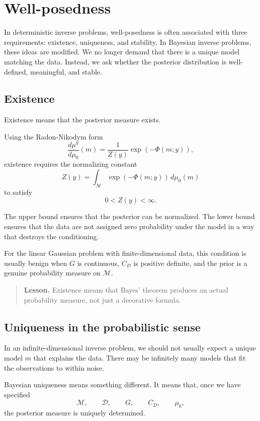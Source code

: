 \documentclass[11pt,a4paper]{book}
\newenvironment{lesson}
  {\begin{quote}\textbf{Lesson.}}
  {\end{quote}}
\newcommand{\M}{\mathcal{M}}      %
\newcommand{\D}{\mathcal{D}}      %
\newcommand{\prior}{\mu_0}
\newcommand{\post}{\mu^y}
\newcommand{\obs}{y}
\newcommand{\G}{G}
\begin{document}
\section{Well-posedness}

In deterministic inverse problems, well-posedness is often associated with
three requirements: existence, uniqueness, and stability. In Bayesian inverse
problems, these ideas are modified. We no longer demand that there is a unique
model matching the data. Instead, we ask whether the posterior distribution is
well-defined, meaningful, and stable.

\subsection{Existence}

Existence means that the posterior measure exists.

Using the Radon-Nikodym form
\[
    \frac{d\post}{d\prior}(m)
    =
    \frac{1}{Z(\obs)}
    \exp(-\Phi(m;\obs)),
\]
existence requires the normalizing constant
\[
    Z(\obs)
    =
    \int_{\M}
    \exp(-\Phi(m;\obs))
    \,d\prior(m)
\]
to satisfy
\[
    0 < Z(\obs) < \infty.
\]

The upper bound ensures that the posterior can be normalized. The lower bound
ensures that the data are not assigned zero probability under the model in a way
that destroys the conditioning.

For the linear Gaussian problem with finite-dimensional data, this condition is
usually benign when $\G$ is continuous, $C_D$ is positive definite, and the
prior is a genuine probability measure on $\M$.

\begin{lesson}
Existence means that Bayes' theorem produces an actual probability measure, not
just a decorative formula.
\end{lesson}

\subsection{Uniqueness in the probabilistic sense}

In an infinite-dimensional inverse problem, we should not usually expect a
unique model $m$ that explains the data. There may be infinitely many models
that fit the observations to within noise.

Bayesian uniqueness means something different. It means that, once we have
specified
\[
    \M,\qquad \D,\qquad \G,\qquad C_D,\qquad \prior,
\]
the posterior measure is uniquely determined.
\end{document}

